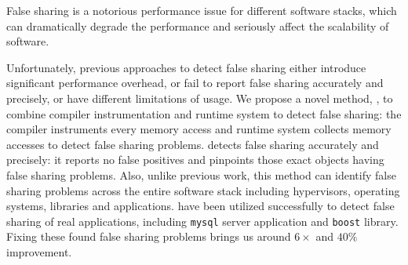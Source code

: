 
\begin{comment}
False sharing is notorious for performance degradation in multithreaded
programs. It apprears when two or more threads running on different cores periodically access 
different portions of data that can fit into one cache line. Since caching
system in a multicore processor needs to ensure a coherent view of memory
accross all cores, it has to grant an exclusive access
for each write operation by invidating duplicate copies in other cores. As a
result, frequent cache invalidation can seriously affect the scalability and
performance of multithreaded programs.
\end{comment} 

False sharing is a notorious performance issue for different software stacks, 
which can dramatically degrade the performance and seriously affect the scalability 
of software.

Unfortunately, previous approaches to detect false sharing
either introduce significant performance overhead, or fail
to report false sharing accurately and precisely, or have different limitations of usage. 
We propose a novel method, \Predator{}, to combine compiler instrumentation
and runtime system to detect false sharing: 
the compiler instruments every memory access and 
runtime system collects memory accesses to detect false sharing problems.
\Predator{} detects false sharing accurately and precisely: it reports no 
false positives and pinpoints those exact objects having false sharing problems.
Also, unlike previous work, this method can
identify false sharing problems across the entire software stack including 
hypervisors, operating systems, libraries and applications. 
\Predator{} have been utilized successfully to detect false sharing of real applications,
including \texttt{mysql} server application and \texttt{boost} library. Fixing these found
false sharing problems brings us around $6\times$ and $40\%$ improvement.

